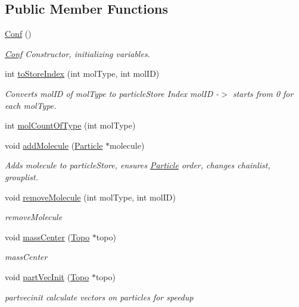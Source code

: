 \subsection*{Public Member Functions}
\begin{DoxyCompactItemize}
\item 
\hyperlink{class_conf_a143db233420f3d2ad3863c5320d6796d}{Conf} ()
\begin{DoxyCompactList}\small\item\em \hyperlink{class_conf}{Conf} Constructor, initializing variables. \end{DoxyCompactList}\item 
int \hyperlink{class_conf_a8b78f1efdb4d4d4f12c62eb390f791ad}{to\+Store\+Index} (int mol\+Type, int mol\+I\+D)
\begin{DoxyCompactList}\small\item\em Converts mol\+I\+D of mol\+Type to particle\+Store Index mol\+I\+D -\/$>$ starts from 0 for each mol\+Type. \end{DoxyCompactList}\item 
int \hyperlink{class_conf_a68e649d0ef31cb107f679598b0391f93}{mol\+Count\+Of\+Type} (int mol\+Type)
\item 
void \hyperlink{class_conf_a0fd2eec969a7e9c1024f02386abf1819}{add\+Molecule} (\hyperlink{class_particle}{Particle} $\ast$molecule)
\begin{DoxyCompactList}\small\item\em Adds molecule to particle\+Store, ensures \hyperlink{class_particle}{Particle} order, changes chainlist, grouplist. \end{DoxyCompactList}\item 
void \hyperlink{class_conf_a520317461ad1275019b00b58816e29b3}{remove\+Molecule} (int mol\+Type, int mol\+I\+D)
\begin{DoxyCompactList}\small\item\em remove\+Molecule \end{DoxyCompactList}\item 
void \hyperlink{class_conf_a4f70f2b18865d894c00fa0138247e32f}{mass\+Center} (\hyperlink{class_topo}{Topo} $\ast$topo)
\begin{DoxyCompactList}\small\item\em mass\+Center \end{DoxyCompactList}\item 
void \hyperlink{class_conf_ad1b87bd14eb659a88c59668c78b6bf02}{part\+Vec\+Init} (\hyperlink{class_topo}{Topo} $\ast$topo)
\begin{DoxyCompactList}\small\item\em partvecinit calculate vectors on particles for speedup \end{DoxyCompactList}\item 

\end{DoxyCompactItemize}

